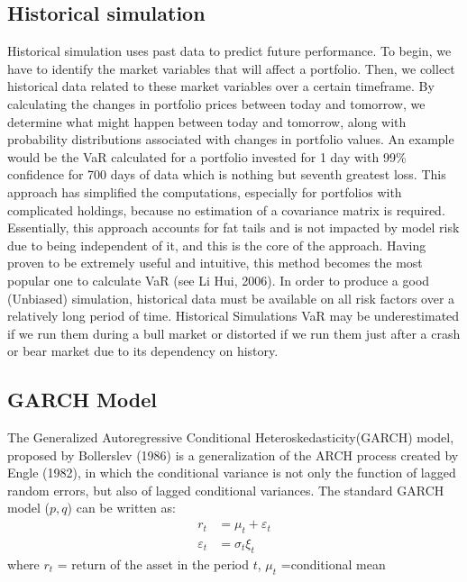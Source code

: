 \documentclass[a4paper,11pt,oneside]{book}
\begin{document}
\subsection{Historical simulation}

Historical simulation uses past data to predict future performance. To begin, we have to identify the market variables that will affect a portfolio. Then, we collect historical data related to these market variables over a certain timeframe. By calculating the changes in portfolio prices between today and tomorrow, we determine what might happen between today and tomorrow, along with probability distributions associated with changes in portfolio values. An example would be the VaR calculated for a portfolio invested for 1 day with 99\% confidence for 700 days of data which is nothing but seventh greatest loss.
\newline\newline This approach has simplified the computations, especially for portfolios with complicated holdings, because no estimation of a covariance matrix is required. Essentially, this approach accounts for fat tails and is not impacted by model risk due to being independent of it, and this is the core of the approach. Having proven to be extremely useful and intuitive, this method becomes the most popular one to calculate VaR (see Li Hui, 2006). In order to produce a good (Unbiased) simulation, historical data must be available on all risk factors over a relatively long period of time. Historical Simulations VaR may be underestimated if we run them during a bull market or distorted if we run them just after a crash or bear market due to its dependency on history.
\subsection{GARCH Model}
The Generalized Autoregressive Conditional Heteroskedasticity(GARCH) model, proposed by Bollerslev
(1986) is a generalization of the ARCH process created by
Engle (1982), in which the conditional variance is not only
the function of lagged random errors, but also of lagged
conditional variances. The standard GARCH model ($p,q$)
can be written as:
\begin{equation}
\begin{aligned}
r_t &= \mu_t + \varepsilon_t
\\
\varepsilon_t &= \sigma_t \xi_t 
\label{6}
\end{aligned}
\end{equation}
where $r_t$ = return of the asset in the period $t$,\newline
$\mu_t$ =conditional mean \newline
\end{document}
